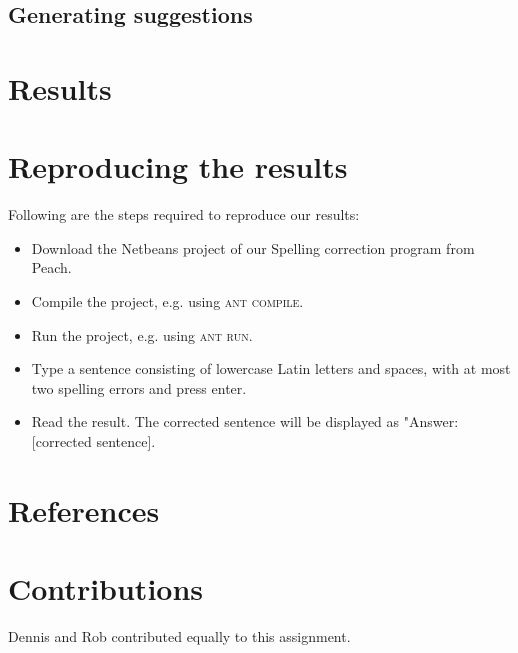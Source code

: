 \documentclass[11pt,a4paper]{article}
\begin{document}
\subsection{Generating suggestions}

\section{Results}

\section{Reproducing the results}
Following are the steps required to reproduce our results:
\begin{itemize}
\item Download the Netbeans project of our Spelling correction program from Peach.
\item Compile the project, e.g. using \textsc{ant compile}.
\item Run the project, e.g. using \textsc{ant run}.
\item Type a sentence consisting of lowercase Latin letters and spaces, with at most two spelling errors and press enter.
\item Read the result. The corrected sentence will be displayed as "Answer: [corrected sentence].
\end{itemize}

\section{References}


\section{Contributions}
Dennis and Rob contributed equally to this assignment.
\end{document}

